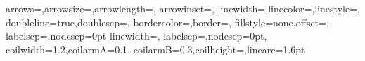     {arrows=\EdgeArrowSty,arrowsize=\EdgeArrowSZDim,arrowlength=\EdgeArrowSZNum,%
         arrowinset=\EdgeArrowIns,%
     linewidth=\EdgeLineDblCoef\EdgeLineWid,linecolor=\EdgeLineCol,linestyle=\EdgeLineSty,%
     doubleline=true,doublesep=\EdgeLineDblSep\EdgeLineWid,%
         bordercolor=\EdgeLineBorderColor,border=\EdgeLineBord,%
     fillstyle=none,offset=\EdgeOff,%
     labelsep=\TransLabelSP,nodesep=0pt}
%
   {linewidth=\ZZLineWid\EdgeLineWid,%
    labelsep=\TransLabelSP,nodesep=0pt,%
    coilwidth=1.2\ZZSiZ,coilarmA=0.1\ZZSiZ,%
    coilarmB=0.3\ZZSiZ,coilheight=\ZZShape,linearc=1.6pt}
\newcommand{\EdgeStyle}{\ifEdgeLineDbl\psset{style=VaucEdgeDblStyle}%
        \else\psset{style=VaucEdgeStyle}\fi}
\newcommand{\ZigzagStyle}%
   {\addtolength{\TransLabelSP}{\TransLabelZZCoef\ZZSiZ}%
    \psset{style=VaucZigzagStyle}%
        \addtolength{\TransLabelSP}{-\TransLabelZZCoef\ZZSiZ}%
        }
\newcommand{\ChgEdgeOffset}[1]{\setlength{\EdgeOff}{#1}}
\newcommand{\RstEdgeOffset}{\ChgEdgeOffset{\EdgeOffset}}
\newcommand{\SetEdgeOffset}[1]%
   {\setlength{\EdgeOffset}{#1}\RstEdgeOffset}
\newcommand{\ForthBackOffset}{%
   \setlength{\EdgeOff}{\ForthBackEdgeOffset\EdgeLineWid}}
%
\newcommand{\ChgArcAngle}[1]{\renewcommand{\VaucArcAng}{#1}}
\newcommand{\RstArcAngle}{\ChgArcAngle{\VaucArcAngle}}
\newcommand{\SetArcAngle}[1]%
   {\renewcommand{\VaucArcAngle}{#1}\RstArcAngle}
%
\newcommand{\ChgLArcAngle}[1]{\renewcommand{\VaucLArcAng}{#1}}
\newcommand{\RstLArcAngle}{\ChgLArcAngle{\VaucLArcAngle}}
\newcommand{\SetLArcAngle}[1]%
   {\renewcommand{\VaucLArcAngle}{#1}\RstLArcAngle}
%
\newcommand{\ChgArcCurvature}[1]{\renewcommand{\VaucArcCurv}{#1}}
\newcommand{\RstArcCurvature}{\ChgArcCurvature{\VaucArcCurvature}}
\newcommand{\SetArcCurvature}[1]%
   {\renewcommand{\VaucArcCurvature}{#1}\RstArcCurvature}
%
\newcommand{\ChgLArcCurvature}[1]{\renewcommand{\VaucLArcCurv}{#1}}
\newcommand{\RstLArcCurvature}{\ChgLArcCurvature{\VaucLArcCurvature}}
